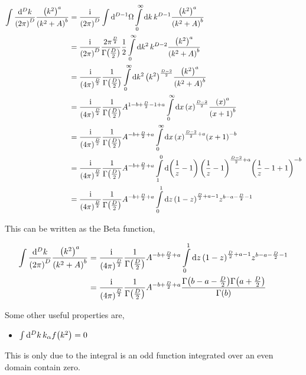 \begin{align}
    \int\frac{\dd[D]{k}}{\qty(2\pi)^D}\frac{\qty(k^2)^a}{\qty(k^2+A)^b}&=\frac{\textnormal{i}}{\qty(2\pi)^D}\int\dd[D-1]{\Omega}\int\limits_0^\infty\dd{k}{k^{D-1}}\frac{\qty(k^2)^a}{\qty(k^2+A)^b}\nonumber\\
    &=\frac{\textnormal{i}}{\qty(2\pi)^D}\frac{2\pi^{\frac D2}}{\Gamma\qty(\frac D2)}\frac12\int\limits_0^\infty\dd{k^2}{k^{D-2}}\frac{\qty(k^2)^a}{\qty(k^2+A)^b}\nonumber\\
    &=\frac{\textnormal{i}}{\qty(4\pi)^{\frac D2}}\frac{1}{\Gamma\qty(\frac D2)}\int\limits_0^\infty\dd{k^2}{\qty(k^2)^{\frac{D-2}{2}}}\frac{\qty(k^2)^a}{\qty(k^2+A)^b}\nonumber\\
    &=\frac{\textnormal{i}}{\qty(4\pi)^{\frac D2}}\frac{1}{\Gamma\qty(\frac D2)}A^{1-b+\frac D2-1+a}\int\limits_0^\infty\dd{x}{\qty(x)^{\frac{D-2}{2}}}\frac{\qty(x)^a}{\qty(x+1)^b}\nonumber\\
    &=\frac{\textnormal{i}}{\qty(4\pi)^{\frac D2}}\frac{1}{\Gamma\qty(\frac D2)}A^{-b+\frac D2+a}\int\limits_0^\infty\dd{x}{\qty(x)^{\frac{D-2}{2}+a}}\qty(x+1)^{-b}\nonumber\\
    &=\frac{\textnormal{i}}{\qty(4\pi)^{\frac D2}}\frac{1}{\Gamma\qty(\frac D2)}A^{-b+\frac D2+a}\int\limits_1^0\dd{\qty(\frac1z-1)}{\qty(\frac1z-1)^{\frac{D-2}{2}+a}}\qty(\frac1z-1+1)^{-b}\nonumber\\
    &=\frac{\textnormal{i}}{\qty(4\pi)^{\frac D2}}\frac{1}{\Gamma\qty(\frac D2)}A^{-b+\frac D2+a}\int\limits_0^1\dd{z}{\qty(1-z)^{\frac D2+a-1}}z^{b-a-\frac D2-1}\nonumber
\end{align}

This can be written as the Beta function,

\begin{align}
    \int\frac{\dd[D]{k}}{\qty(2\pi)^D}\frac{\qty(k^2)^a}{\qty(k^2+A)^b}&
    =\frac{\textnormal{i}}{\qty(4\pi)^{\frac D2}}\frac{1}{\Gamma\qty(\frac D2)}A^{-b+\frac D2+a}\int\limits_0^1\dd{z}{\qty(1-z)^{\frac D2+a-1}}z^{b-a-\frac D2-1}\nonumber\\
    &=\frac{\textnormal{i}}{\qty(4\pi)^{\frac D2}}\frac{1}{\Gamma\qty(\frac D2)}A^{-b+\frac D2+a}\frac{\Gamma\qty(b-a-\frac D2)\Gamma\qty(a+\frac D2)}{\Gamma\qty(b)}\nonumber
\end{align}

Some other useful properties are,

\begin{itemize}
    \item $\int\dd[D]{k}k_\alpha f\qty(k^2)=0$
\end{itemize}

This is only due to the integral is an odd function integrated over an even domain contain zero.

